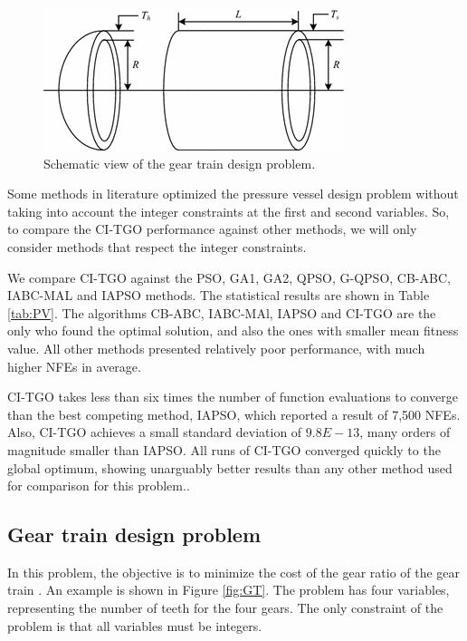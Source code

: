 \begin{figure}[h]
\begin{center}
\includegraphics[scale=0.6]{Imgs/PV.png}
\end{center}
\captionsetup{justification=centering}
\caption{Schematic view of the gear train design problem.}\label{fig:PV}
\end{figure}


Some methods in literature optimized the pressure vessel design problem without taking into account the integer constraints at the first and second variables. So, to compare the CI-TGO performance against other methods, we will only consider methods that respect the integer constraints.



We compare CI-TGO against the PSO, GA1, GA2, QPSO, G-QPSO, CB-ABC, IABC-MAL and IAPSO methods. The statistical results are shown in Table \ref{tab:PV}. The algorithms CB-ABC, IABC-MAl, IAPSO and CI-TGO are the only who found the optimal solution, and also the ones with smaller mean fitness value. All other methods presented relatively poor performance, with much higher NFEs in average.

CI-TGO takes less than six times the number of function evaluations to converge than the best competing method, IAPSO, which reported a result of 7,500 NFEs. Also, CI-TGO achieves a small standard deviation of $9.8E-13$, many orders of magnitude smaller than IAPSO. All runs of CI-TGO converged quickly to the global optimum, showing unarguably better results than any other method used for comparison for this problem..



\subsection{Gear train design problem}

In this problem, the objective is to minimize the cost of the gear ratio of the gear train \citep{PV}. An example is shown in Figure \ref{fig:GT}. The problem has four variables, representing the number of teeth for the four gears. The only constraint of the problem is that all variables must be integers.


